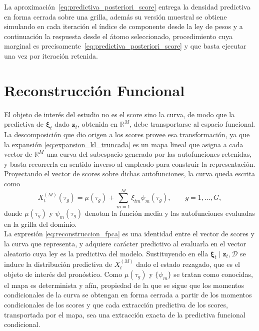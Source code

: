 La aproximación~\eqref{eq:predictiva_posteriori_score} entrega la densidad predictiva en forma cerrada sobre una grilla, además su versión muestral se obtiene simulando en cada iteración el índice de componente desde la ley de pesos y a continuación la respuesta desde el átomo seleccionado, procedimiento cuya marginal es precisamente~\eqref{eq:predictiva_posteriori_score} y que basta ejecutar una vez por iteración retenida.


\section{Reconstrucción Funcional}
\label{03_05_00_reconstruccion_funcional}

El objeto de interés del estudio no es el score sino la curva, de modo que la predictiva de $\boldsymbol{\xi}_t$ dado $\mathbf{z}_t$, obtenida en $\mathbb{R}^{M}$, debe transportarse al espacio funcional. La descomposición que dio origen a los scores provee esa transformación, ya que la expansión \eqref{eq:expansion_kl_truncada} es un mapa lineal que asigna a cada vector de $\mathbb{R}^{M}$ una curva del subespacio generado por las autofunciones retenidas, y basta recorrerla en sentido inverso al empleado para construir la representación. Proyectando el vector de scores sobre dichas autofunciones, la curva queda escrita como
\begin{equation}\label{eq:reconstruccion_fpca}
    X_t^{(M)}(\tau_g) = \mu(\tau_g)
    + \sum_{m=1}^{M} \xi_{tm}\psi_m(\tau_g),
    \qquad g = 1, \dots, G,
\end{equation}
donde $\mu(\tau_g)$ y $\psi_m(\tau_g)$ denotan la función media y las autofunciones evaluadas en la grilla del dominio.\\

La expresión \eqref{eq:reconstruccion_fpca} es una identidad entre el vector de scores y la curva que representa, y adquiere carácter predictivo al evaluarla en el vector aleatorio cuya ley es la predictiva del modelo. Sustituyendo en ella $\boldsymbol{\xi}_t \mid \mathbf{z}_t, \mathcal{D}$ se induce la distribución predictiva de $X_t^{(M)}$ dado el estado rezagado, que es el objeto de interés del pronóstico. Como $\mu(\tau_g)$ y $\{\psi_m\}$ se tratan como conocidas, el mapa es determinista y afín, propiedad de la que se sigue que los momentos condicionales de la curva se obtengan en forma cerrada a partir de los momentos condicionales de los scores y que cada extracción predictiva de los scores, transportada por el mapa, sea una extracción exacta de la predictiva funcional condicional.\\


